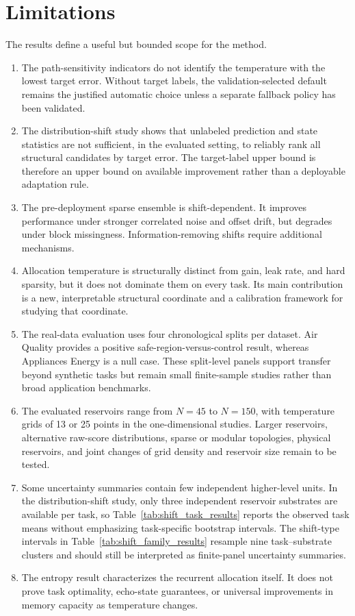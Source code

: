 \documentclass[11pt,a4paper]{article}
\begin{document}
\section{Limitations}
\label{sec:limitations}

The results define a useful but bounded scope for the method.
\begin{enumerate}[leftmargin=*]
  \item The path-sensitivity indicators do not identify the temperature with the lowest target error. Without target labels, the validation-selected default remains the justified automatic choice unless a separate fallback policy has been validated.
  \item The distribution-shift study shows that unlabeled prediction and state statistics are not sufficient, in the evaluated setting, to reliably rank all structural candidates by target error. The target-label upper bound is therefore an upper bound on available improvement rather than a deployable adaptation rule.
  \item The pre-deployment sparse ensemble is shift-dependent. It improves performance under stronger correlated noise and offset drift, but degrades under block missingness. Information-removing shifts require additional mechanisms.
  \item Allocation temperature is structurally distinct from gain, leak rate, and hard sparsity, but it does not dominate them on every task. Its main contribution is a new, interpretable structural coordinate and a calibration framework for studying that coordinate.
  \item The real-data evaluation uses four chronological splits per dataset. Air Quality provides a positive safe-region-versus-control result, whereas Appliances Energy is a null case. These split-level panels support transfer beyond synthetic tasks but remain small finite-sample studies rather than broad application benchmarks.
  \item The evaluated reservoirs range from $N=45$ to $N=150$, with temperature grids of 13 or 25 points in the one-dimensional studies. Larger reservoirs, alternative raw-score distributions, sparse or modular topologies, physical reservoirs, and joint changes of grid density and reservoir size remain to be tested.
  \item Some uncertainty summaries contain few independent higher-level units. In the distribution-shift study, only three independent reservoir substrates are available per task, so Table~\ref{tab:shift_task_results} reports the observed task means without emphasizing task-specific bootstrap intervals. The shift-type intervals in Table~\ref{tab:shift_family_results} resample nine task--substrate clusters and should still be interpreted as finite-panel uncertainty summaries.
  \item The entropy result characterizes the recurrent allocation itself. It does not prove task optimality, echo-state guarantees, or universal improvements in memory capacity as temperature changes.
\end{enumerate}
\end{document}
